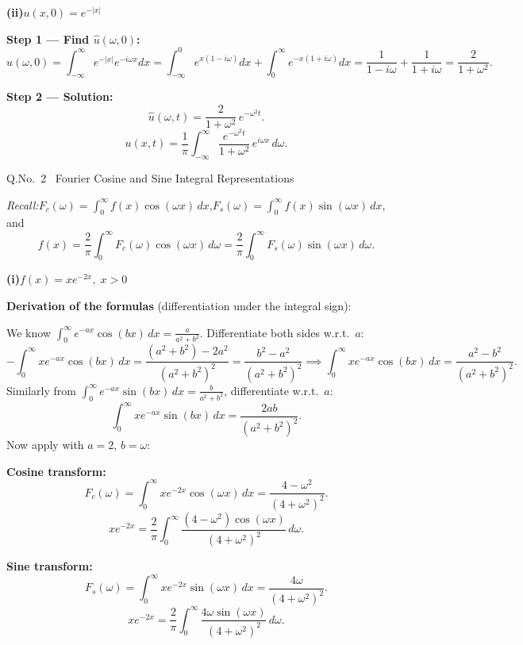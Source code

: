 \documentclass[12pt]{article}
\begin{document}
\medskip
\textbf{(ii)}\quad $u(x,0)=e^{-|x|}$

\begin{ansbox}
\textbf{Step 1 — Find $\hat{u}(\omega,0)$:}
\[
  \hat{u}(\omega,0)=\int_{-\infty}^{\infty}e^{-|x|}e^{-i\omega x}dx
  =\int_{-\infty}^{0}e^{x(1-i\omega)}dx+\int_{0}^{\infty}e^{-x(1+i\omega)}dx
  =\frac{1}{1-i\omega}+\frac{1}{1+i\omega}=\frac{2}{1+\omega^2}.
\]

\textbf{Step 2 — Solution:}
\[
  \hat{u}(\omega,t)=\frac{2}{1+\omega^2}\,e^{-\omega^2 t}.
\]
\[
  \boxed{u(x,t)=\frac{1}{\pi}\int_{-\infty}^{\infty}\frac{e^{-\omega^2 t}}{1+\omega^2}\,e^{i\omega x}\,d\omega.}
\]
\end{ansbox}

\vspace{12pt}

\begin{qbox}{Q.No.\ 2 \textemdash\ Fourier Cosine and Sine Integral Representations}
\end{qbox}

\medskip
\textit{Recall:}\quad $F_c(\omega)=\int_0^\infty f(x)\cos(\omega x)\,dx$,\quad $F_s(\omega)=\int_0^\infty f(x)\sin(\omega x)\,dx$, and
\[f(x)=\frac{2}{\pi}\int_0^\infty F_c(\omega)\cos(\omega x)\,d\omega=\frac{2}{\pi}\int_0^\infty F_s(\omega)\sin(\omega x)\,d\omega.\]

\medskip\textbf{(i)}\quad $f(x)=xe^{-2x},\;x>0$

\begin{ansbox}
\textbf{Derivation of the formulas} (differentiation under the integral sign):

We know $\displaystyle\int_0^\infty e^{-ax}\cos(bx)\,dx=\frac{a}{a^2+b^2}$. Differentiate both sides w.r.t.\ $a$:
\[
  -\int_0^\infty xe^{-ax}\cos(bx)\,dx=\frac{(a^2+b^2)-2a^2}{(a^2+b^2)^2}=\frac{b^2-a^2}{(a^2+b^2)^2}
  \implies \int_0^\infty xe^{-ax}\cos(bx)\,dx=\frac{a^2-b^2}{(a^2+b^2)^2}.
\]
Similarly from $\displaystyle\int_0^\infty e^{-ax}\sin(bx)\,dx=\frac{b}{a^2+b^2}$, differentiate w.r.t.\ $a$:
\[
  \int_0^\infty xe^{-ax}\sin(bx)\,dx=\frac{2ab}{(a^2+b^2)^2}.
\]
Now apply with $a=2$, $b=\omega$:

\textbf{Cosine transform:}
\[
  F_c(\omega)=\int_0^\infty xe^{-2x}\cos(\omega x)\,dx=\frac{4-\omega^2}{(4+\omega^2)^2}.
\]
\[
  \boxed{xe^{-2x}=\frac{2}{\pi}\int_0^\infty\frac{(4-\omega^2)\cos(\omega x)}{(4+\omega^2)^2}\,d\omega.}
\]

\textbf{Sine transform:}
\[
  F_s(\omega)=\int_0^\infty xe^{-2x}\sin(\omega x)\,dx=\frac{4\omega}{(4+\omega^2)^2}.
\]
\[
  \boxed{xe^{-2x}=\frac{2}{\pi}\int_0^\infty\frac{4\omega\sin(\omega x)}{(4+\omega^2)^2}\,d\omega.}
\]
\end{ansbox}
\end{document}
